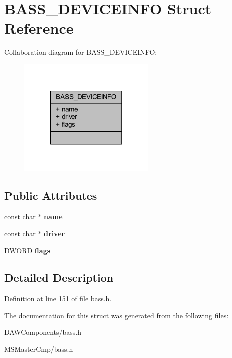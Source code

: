 \hypertarget{struct_b_a_s_s___d_e_v_i_c_e_i_n_f_o}{\section{B\-A\-S\-S\-\_\-\-D\-E\-V\-I\-C\-E\-I\-N\-F\-O Struct Reference}
\label{struct_b_a_s_s___d_e_v_i_c_e_i_n_f_o}
}


Collaboration diagram for B\-A\-S\-S\-\_\-\-D\-E\-V\-I\-C\-E\-I\-N\-F\-O\-:\nopagebreak
\begin{figure}[H]
\begin{center}
\leavevmode
\includegraphics[width=186pt]{struct_b_a_s_s___d_e_v_i_c_e_i_n_f_o__coll__graph}
\end{center}
\end{figure}
\subsection*{Public Attributes}
\begin{DoxyCompactItemize}
\item 
\hypertarget{struct_b_a_s_s___d_e_v_i_c_e_i_n_f_o_a60c99441ee0628febb504c9665bf0f65_a60c99441ee0628febb504c9665bf0f65}{const char $\ast$ {\bfseries name}}\label{struct_b_a_s_s___d_e_v_i_c_e_i_n_f_o_a60c99441ee0628febb504c9665bf0f65_a60c99441ee0628febb504c9665bf0f65}

\item 
\hypertarget{struct_b_a_s_s___d_e_v_i_c_e_i_n_f_o_a9fca2b47e2294e7adad36cecd7e3d7ca_a9fca2b47e2294e7adad36cecd7e3d7ca}{const char $\ast$ {\bfseries driver}}\label{struct_b_a_s_s___d_e_v_i_c_e_i_n_f_o_a9fca2b47e2294e7adad36cecd7e3d7ca_a9fca2b47e2294e7adad36cecd7e3d7ca}

\item 
\hypertarget{struct_b_a_s_s___d_e_v_i_c_e_i_n_f_o_ae5d2db8d3570744a4b24e41dfa62554b_ae5d2db8d3570744a4b24e41dfa62554b}{D\-W\-O\-R\-D {\bfseries flags}}\label{struct_b_a_s_s___d_e_v_i_c_e_i_n_f_o_ae5d2db8d3570744a4b24e41dfa62554b_ae5d2db8d3570744a4b24e41dfa62554b}

\end{DoxyCompactItemize}


\subsection{Detailed Description}


Definition at line 151 of file bass.\-h.



The documentation for this struct was generated from the following files\-:\begin{DoxyCompactItemize}
\item 
D\-A\-W\-Components/bass.\-h\item 
M\-S\-Master\-Cmp/bass.\-h\end{DoxyCompactItemize}
